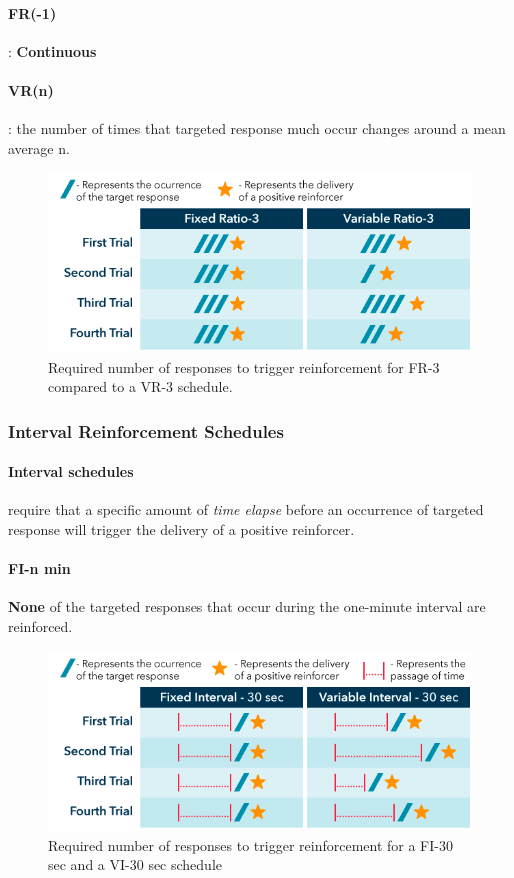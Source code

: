 \documentclass{article}
\begin{document}
	\paragraph{FR(-1)}: \textbf{Continuous}
	\paragraph{VR(n)}: the number of times that targeted response much occur changes around a mean average n.
	\begin{figure}
		\centering
		\includegraphics[width=\linewidth]{pic/reinforce_ratio}
		\caption{Required number of responses to trigger reinforcement for FR-3 compared to a VR-3 schedule.}
	\end{figure}
	\subsubsection{Interval Reinforcement Schedules}
	\paragraph{Interval schedules} require that a specific amount of \emph{time elapse} before an occurrence of targeted response will trigger the delivery of a positive reinforcer.
	\paragraph{FI-n min} \textbf{None} of the targeted responses that occur during the one-minute interval are reinforced.
	\begin{figure}
		\centering
		\includegraphics[width = \linewidth ]{pic/reinforcing_interval}
		\caption{Required number of responses to trigger reinforcement for a FI-30 sec and a VI-30 sec schedule}
	\end{figure}
\end{document}
